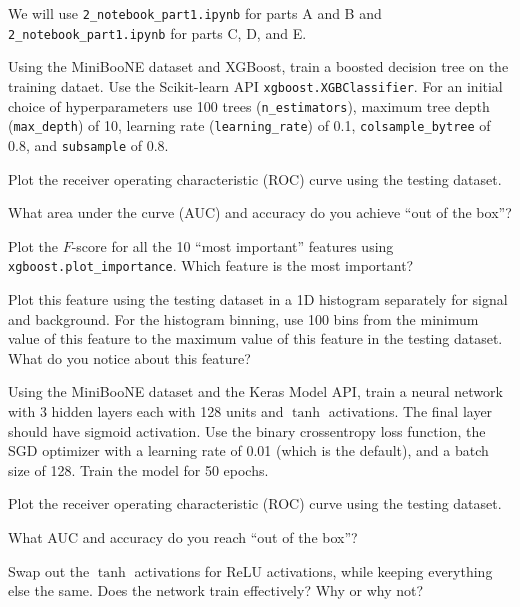 We will use \texttt{2_notebook_part1.ipynb} for parts A and B and \texttt{2_notebook_part1.ipynb} for parts C, D, and E.

\begin{problem}[15]
Using the MiniBooNE dataset and XGBoost, train a boosted decision tree on the training dataet.
Use the Scikit-learn API \texttt{xgboost.XGBClassifier}.
For an initial choice of hyperparameters use 100 trees (\texttt{n_estimators}), maximum tree depth (\texttt{max_depth}) of 10, learning rate (\texttt{learning_rate}) of 0.1, \texttt{colsample_bytree} of 0.8, and \texttt{subsample} of 0.8.

Plot the receiver operating characteristic (ROC) curve using the testing dataset.

What area under the curve (AUC) and accuracy do you achieve ``out of the box''?
\end{problem}


\begin{problem}[5]
Plot the $F$-score for all the 10 ``most important'' features using \texttt{xgboost.plot_importance}.
Which feature is the most important?

Plot this feature using the testing dataset in a 1D histogram separately for signal and background.
For the histogram binning, use 100 bins from the minimum value of this feature to the maximum value of this feature in the testing dataset.
What do you notice about this feature?
\end{problem}


\begin{problem}[15]
Using the MiniBooNE dataset and the Keras Model API, train a neural network with 3 hidden layers each with 128 units and $\tanh$ activations.
The final layer should have sigmoid activation.
Use the binary crossentropy loss function, the SGD optimizer with a learning rate of 0.01 (which is the default), and a batch size of 128.
Train the model for 50 epochs.

Plot the receiver operating characteristic (ROC) curve using the testing dataset.

What AUC and accuracy do you reach ``out of the box''?
\end{problem}


\begin{problem}[5]
Swap out the $\tanh$ activations for ReLU activations, while keeping everything else the same.
Does the network train effectively?
Why or why not?
\end{problem}

